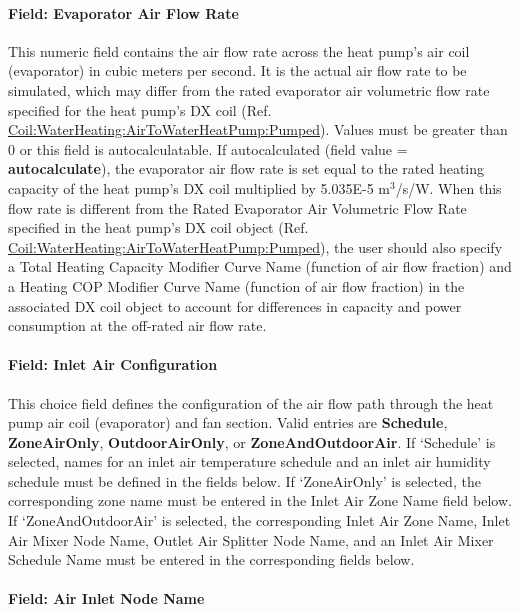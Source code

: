 \paragraph{Field: Evaporator Air Flow Rate}\label{field-evaporator-air-flow-rate}

This numeric field contains the air flow rate across the heat pump's air coil (evaporator) in cubic meters per second. It is the actual air flow rate to be simulated, which may differ from the rated evaporator air volumetric flow rate specified for the heat pump's DX coil (Ref. \hyperref[coilwaterheatingairtowaterheatpumppumped]{Coil:WaterHeating:AirToWaterHeatPump:Pumped}). Values must be greater than 0 or this field is autocalculatable. If autocalculated (field value = \textbf{autocalculate}), the evaporator air flow rate is set equal to the rated heating capacity of the heat pump's DX coil multiplied by 5.035E-5 m\(^{3}\)/s/W. When this flow rate is different from the Rated Evaporator Air Volumetric Flow Rate specified in the heat pump's DX coil object (Ref. \hyperref[coilwaterheatingairtowaterheatpumppumped]{Coil:WaterHeating:AirToWaterHeatPump:Pumped}), the user should also specify a Total Heating Capacity Modifier Curve Name (function of air flow fraction) and a Heating COP Modifier Curve Name (function of air flow fraction) in the associated DX coil object to account for differences in capacity and power consumption at the off-rated air flow rate.

\paragraph{Field: Inlet Air Configuration}\label{field-inlet-air-configuration}

This choice field defines the configuration of the air flow path through the heat pump air coil (evaporator) and fan section. Valid entries are \textbf{Schedule}, \textbf{ZoneAirOnly}, \textbf{OutdoorAirOnly}, or \textbf{ZoneAndOutdoorAir}. If `Schedule' is selected, names for an inlet air temperature schedule and an inlet air humidity schedule must be defined in the fields below. If `ZoneAirOnly' is selected, the corresponding zone name must be entered in the Inlet Air Zone Name field below. If `ZoneAndOutdoorAir' is selected, the corresponding Inlet Air Zone Name, Inlet Air Mixer Node Name, Outlet Air Splitter Node Name, and an Inlet Air Mixer Schedule Name must be entered in the corresponding fields below.

\paragraph{Field: Air Inlet Node Name}\label{field-air-inlet-node-name-008}

